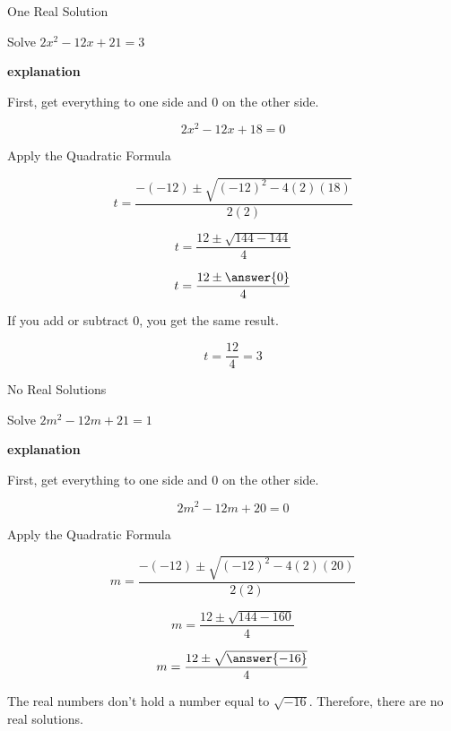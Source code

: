 \documentclass{ximera}
\begin{document}
\begin{example} One Real Solution

Solve $2 x^2 - 12x + 21 = 3$ 

\textbf{\textcolor{red!75!green}{explanation}} 

First, get everything to one side and $0$ on the other side.



\[  2 x^2 - 12x + 18 = 0  \]

Apply the Quadratic Formula


\[   t = \frac{-(-12) \pm \sqrt{(-12)^2 - 4 (2) (18)}}{2 (2)}            \]



\[   t = \frac{12 \pm \sqrt{144 - 144}}{4}            \]

\[   t = \frac{12 \pm \answer{0}}{4}            \]

If you add or subtract $0$, you get the same result.

\[   t = \frac{12}{4}   = 3         \]







\end{example}








\begin{example} No Real Solutions

Solve $2 m^2 - 12m + 21 = 1$ 

\textbf{\textcolor{red!75!green}{explanation}} 

First, get everything to one side and $0$ on the other side.



\[  2 m^2 - 12m + 20 = 0  \]

Apply the Quadratic Formula


\[   m = \frac{-(-12) \pm \sqrt{(-12)^2 - 4 (2) (20)}}{2 (2)}            \]

\[   m = \frac{12 \pm \sqrt{144 - 160}}{4}            \]

\[   m = \frac{12 \pm \sqrt{\answer{-16}}}{4}            \]



The real numbers don't hold a number equal to $\sqrt{-16}$.  Therefore, there are no real solutions.





\end{example}
\end{document}
